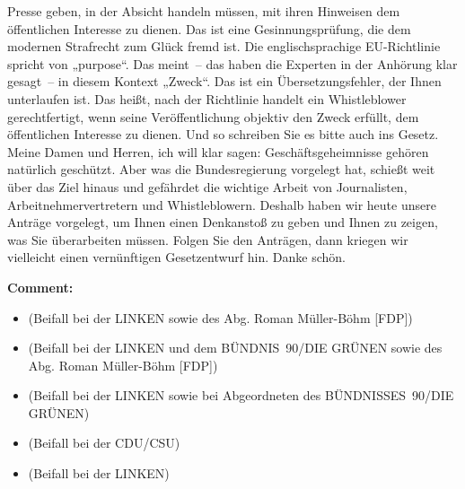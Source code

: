 \documentclass{article}
\begin{document}
Presse geben, in der Absicht handeln müssen, mit ihren Hinweisen dem öffentlichen Interesse zu dienen. Das ist eine Gesinnungsprüfung, die dem modernen Strafrecht zum Glück fremd ist. Die englischsprachige EU-Richtlinie spricht von „purpose“. Das meint – das haben die Experten in der Anhörung klar gesagt – in diesem Kontext „Zweck“. Das ist ein Übersetzungsfehler, der Ihnen unterlaufen ist. Das heißt, nach der Richtlinie handelt ein Whistleblower gerechtfertigt, wenn seine Veröffentlichung objektiv den Zweck erfüllt, dem öffentlichen Interesse zu dienen. Und so schreiben Sie es bitte auch ins Gesetz.  Meine Damen und Herren, ich will klar sagen: Geschäftsgeheimnisse gehören natürlich geschützt. Aber was die Bundesregierung vorgelegt hat, schießt weit über das Ziel hinaus und gefährdet die wichtige Arbeit von Journalisten, Arbeitnehmervertretern und Whistleblowern. Deshalb haben wir heute unsere Anträge vorgelegt, um Ihnen einen Denkanstoß zu geben und Ihnen zu zeigen, was Sie überarbeiten müssen. Folgen Sie den Anträgen, dann kriegen wir vielleicht einen vernünftigen Gesetzentwurf hin. Danke schön.  

\noindent\textbf{Comment:}
\begin{itemize}
    \setlength\itemsep{-3pt}
    \item (Beifall bei der LINKEN sowie des Abg. Roman Müller-Böhm [FDP])
    \setlength\itemsep{-3pt}
    \item (Beifall bei der LINKEN und dem BÜNDNIS 90/DIE GRÜNEN sowie des Abg. Roman Müller-Böhm [FDP])
    \setlength\itemsep{-3pt}
    \item (Beifall bei der LINKEN sowie bei Abgeordneten des BÜNDNISSES 90/DIE GRÜNEN)
    \setlength\itemsep{-3pt}
    \item (Beifall bei der CDU/CSU)
    \setlength\itemsep{-3pt}
    \item (Beifall bei der LINKEN)
\end{itemize}
\end{document}
